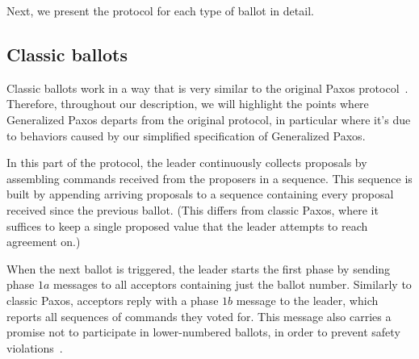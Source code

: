 Next, we present the protocol for each type of ballot in detail.

\subsection{Classic ballots} 

Classic ballots work in a way that is very similar to the original Paxos protocol~\cite{Lam98}. Therefore, throughout our description, we will highlight the points where Generalized Paxos departs from the original protocol, in particular where it's due to behaviors caused by our simplified specification of Generalized Paxos.\par
In this part of the protocol, the leader continuously collects proposals by assembling commands received from the proposers in a sequence. This sequence is built by appending arriving proposals to a sequence containing every proposal received since the previous ballot. (This differs from classic Paxos, where it suffices to keep a single proposed value that the leader attempts to reach agreement on.)\par
When the next ballot is triggered, the leader starts the first phase by sending phase $1a$ messages to all acceptors containing just the ballot number. Similarly to classic Paxos, acceptors reply with a phase $1b$ message to the leader, which reports all sequences of commands they voted for. This message also carries a promise not to participate in lower-numbered ballots, in order to prevent safety violations~\cite{Lam98}.

